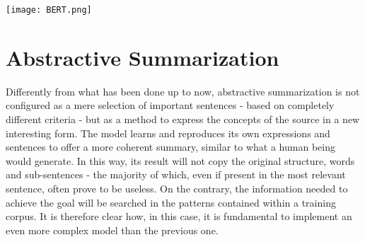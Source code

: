 \documentclass[fleqn,10pt]{SelfArx} %
\begin{document}
\par
{\centering\vspace{10pt}
\texttt{[image: BERT.png]}
\vspace{10pt}
\par}
\section{Abstractive Summarization}
Differently from what has been done up to now, abstractive summarization is not configured as a mere selection of important sentences - based on completely different criteria - but as a method to express the concepts of the source in a new interesting form. The model learns and reproduces its own expressions and sentences to offer a more coherent summary, similar to what a human being would generate. In this way, its result will not copy the original structure, words and sub-sentences - the majority of which, even if present in the most relevant sentence, often prove to be useless. On the contrary, the information needed to achieve the goal will be searched in the patterns contained within a training corpus. It is therefore clear how, in this case, it is fundamental to implement an even more complex model than the previous one.
\end{document}
